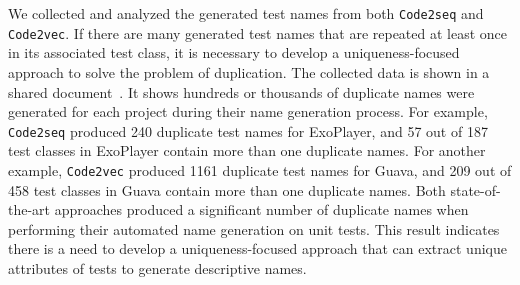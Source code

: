 \begin{appendices}
We collected and analyzed the generated test names from both \texttt{Code2seq} and \texttt{Code2vec}.
%
If there are many generated test names that are repeated at least once in its associated test class, it is necessary to develop a uniqueness-focused approach to solve the problem of duplication.
%
The collected data is shown in a shared document~\cite{CodeResult}.
%
It shows hundreds or thousands of duplicate names were generated for each project during their name generation process. 
%
For example, \texttt{Code2seq} produced \num{240} duplicate test names for ExoPlayer, and \num{57} out of \num{187} test classes in ExoPlayer contain more than one duplicate names.
%
For another example, \texttt{Code2vec} produced \num{1161} duplicate test names for Guava, and \num{209} out of \num{458} test classes in Guava contain more than one duplicate names.
%
Both state-of-the-art approaches produced a significant number of duplicate names when performing their automated name generation on unit tests.
%
This result indicates there is a need to develop a uniqueness-focused approach that can extract unique attributes of tests to generate descriptive names.


\end{appendices}